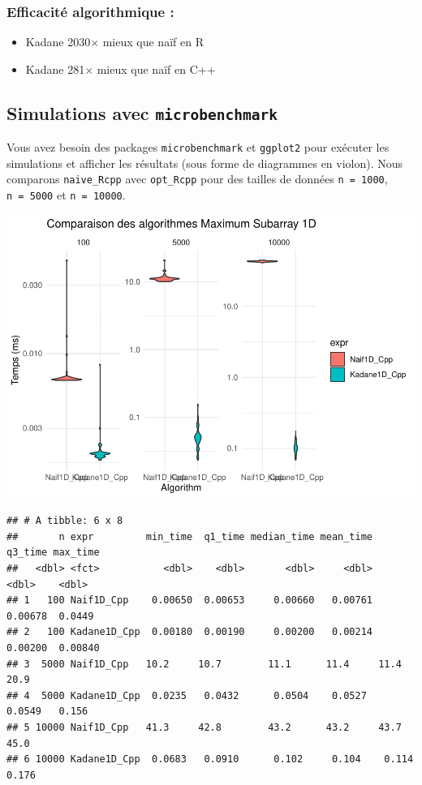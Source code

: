 \documentclass[
]{article}
\begin{document}
\subsubsection{Efficacité algorithmique
:}\label{efficacituxe9-algorithmique}

\begin{itemize}
\item
  Kadane 2030× mieux que naïf en R\\
\item
  Kadane 281× mieux que naïf en C++
\end{itemize}

\subsection{\texorpdfstring{Simulations avec
\texttt{microbenchmark}}{Simulations avec microbenchmark}}\label{simulations-avec-microbenchmark}

Vous avez besoin des packages \texttt{microbenchmark} et
\texttt{ggplot2} pour exécuter les simulations et afficher les résultats
(sous forme de diagrammes en violon). Nous comparons
\texttt{naive\_Rcpp} avec \texttt{opt\_Rcpp} pour des tailles de données
\texttt{n\ =\ 1000}, \texttt{n\ =\ 5000} et \texttt{n\ =\ 10000}.

\includegraphics{MaxSubarray1D_files/figure-latex/benchmark-1.pdf}

\begin{verbatim}
## # A tibble: 6 x 8
##       n expr         min_time  q1_time median_time mean_time  q3_time max_time
##   <dbl> <fct>           <dbl>    <dbl>       <dbl>     <dbl>    <dbl>    <dbl>
## 1   100 Naif1D_Cpp    0.00650  0.00653     0.00660   0.00761  0.00678  0.0449 
## 2   100 Kadane1D_Cpp  0.00180  0.00190     0.00200   0.00214  0.00200  0.00840
## 3  5000 Naif1D_Cpp   10.2     10.7        11.1      11.4     11.4     20.9    
## 4  5000 Kadane1D_Cpp  0.0235   0.0432      0.0504    0.0527   0.0549   0.156  
## 5 10000 Naif1D_Cpp   41.3     42.8        43.2      43.2     43.7     45.0    
## 6 10000 Kadane1D_Cpp  0.0683   0.0910      0.102     0.104    0.114    0.176
\end{verbatim}
\end{document}
